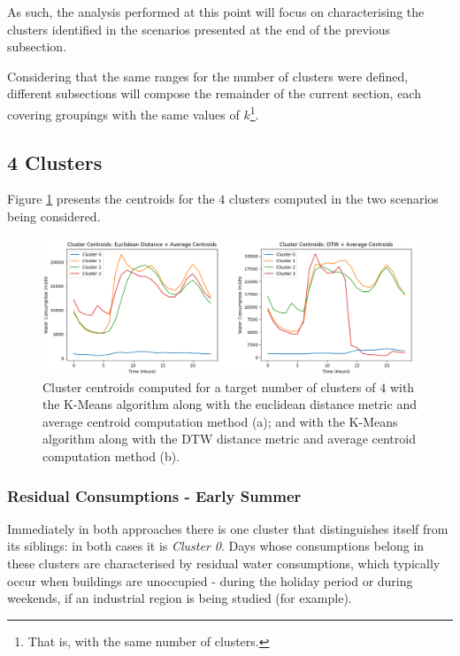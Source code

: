 \documentclass[9pt,journal,compsoc]{IEEEtran}
\begin{document}
As such, the analysis performed at this point will focus on characterising the clusters identified in the scenarios presented at the end of the previous subsection.

Considering that the same ranges for the number of clusters were defined, different subsections will compose the remainder of the current section, each covering groupings with the same values of $k$\footnote{That is, with the same number of clusters.}.

\subsection{4 Clusters}

Figure \ref{centroids_4clusters} presents the centroids for the $4$ clusters computed in the two scenarios being considered.

\begin{figure}
	\centering
	\includegraphics[scale=0.4]{images/centroids_4_clusters.png}
	\caption{Cluster centroids computed for a target number of clusters of $4$ with the K-Means algorithm along with the euclidean distance metric and average centroid computation method (a); and with the K-Means algorithm along with the DTW distance metric and average centroid computation method (b).}
	\label{centroids_4clusters}
\end{figure}

\subsubsection{Residual Consumptions - Early Summer}
\label{residual_consumptions}

Immediately in both approaches there is one cluster that distinguishes itself from its siblings: in both cases it is \emph{Cluster 0}. Days whose consumptions belong in these clusters are characterised by residual water consumptions, which typically occur when buildings are unoccupied - during the holiday period or during weekends, if an industrial region is being studied (for example).
\end{document}
